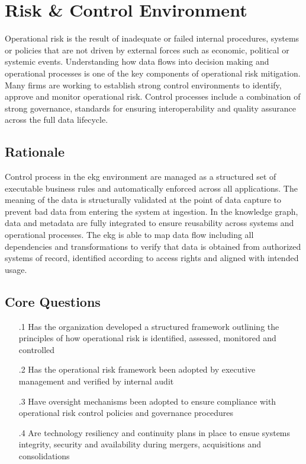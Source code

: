 \section{Risk \& Control Environment}\label{ch:b-4-6} %

Operational risk is the result of inadequate or failed internal procedures,
systems or policies that are not driven by external forces such as economic, political or systemic events.
Understanding how data flows into decision making and operational processes is one of the key components of operational risk mitigation.
Many firms are working to establish strong control environments to identify, approve and monitor operational risk.
Control processes include a combination of strong governance, standards for ensuring interoperability and quality assurance across the full data lifecycle.

\subsection*{ Rationale}

Control process in the \acrshort{ekg} environment are managed as a structured set of executable business rules and automatically enforced across all applications.
The meaning of the data is structurally validated at the point of data capture to prevent bad data from entering the system at ingestion.
In the knowledge graph, data and metadata are fully integrated to ensure reusability across systems and operational processes.
The \acrshort{ekg} is able to map data flow including all dependencies and transformations to verify that data is obtained from authorized systems of record,
identified according to access rights and aligned with intended usage.

\subsection*{Core Questions}

\begin{itemize}[leftmargin=.5in]

  \item [\thesection.1] Has the organization developed a structured framework outlining the principles of how operational risk is identified, assessed, monitored and controlled
  \item [\thesection.2] Has the operational risk framework been adopted by executive management and verified by internal audit
  \item [\thesection.3] Have oversight mechanisms been adopted to ensure compliance with operational risk control policies and governance procedures
  \item [\thesection.4] Are technology resiliency and continuity plans in place to ensue systems integrity, security and availability during mergers, acquisitions and consolidations

\end{itemize}
